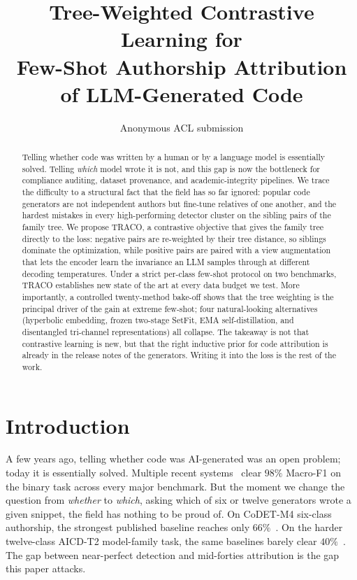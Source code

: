 ﻿\documentclass[11pt]{article}
\title{Tree-Weighted Contrastive Learning for \\
Few-Shot Authorship Attribution of LLM-Generated Code}
\author{Anonymous ACL submission}
\newcommand{\method}{\textsc{TRACO}\xspace}
\begin{document}
\maketitle

\begin{abstract}
Telling whether code was written by a human or by a language model is
essentially solved. Telling \emph{which} model wrote it is not, and
this gap is now the bottleneck for compliance auditing, dataset
provenance, and academic-integrity pipelines. We trace the difficulty
to a structural fact that the field has so far ignored: popular code
generators are not independent authors but fine-tune relatives of one
another, and the hardest mistakes in every high-performing detector
cluster on the sibling pairs of the family tree. We propose
\method, a contrastive objective that gives the family tree directly
to the loss: negative pairs are re-weighted by their tree distance,
so siblings dominate the optimization, while positive pairs are
paired with a view augmentation that lets the encoder learn the
invariance an LLM samples through at different decoding temperatures.
Under a strict per-class few-shot protocol on two benchmarks,
\method establishes new state of the art at every data budget we
test. More importantly, a controlled twenty-method bake-off shows
that the tree weighting is the principal driver of the gain at
extreme few-shot; four natural-looking alternatives (hyperbolic
embedding, frozen two-stage SetFit, EMA self-distillation, and
disentangled tri-channel representations) all collapse. The takeaway
is not that contrastive learning is new, but that the right inductive
prior for code attribution is already in the release notes of the
generators. Writing it into the loss is the rest of the work.
\end{abstract}

\section{Introduction}
\label{sec:intro}

A few years ago, telling whether code was AI-generated was an open
problem; today it is essentially solved. Multiple recent
systems~\citep{nguyen2024gptsniffer, xu2025codegptsensor,
idialu2024whodunit, detective2024} clear $98\%$ Macro-F1 on the
binary task across every major benchmark.
But the moment we change the question from \emph{whether} to
\emph{which}, asking which of six or twelve generators wrote a given
snippet, the field has nothing to be proud of.
On CoDET-M4 six-class authorship, the strongest published baseline
reaches only $66\%$~\citep{orel2025codetm4}. On the harder
twelve-class AICD-T2 model-family task, the same baselines barely
clear $40\%$~\citep{orel2026aicd}. The gap between near-perfect
detection and mid-forties attribution is the gap this paper attacks.
\end{document}
